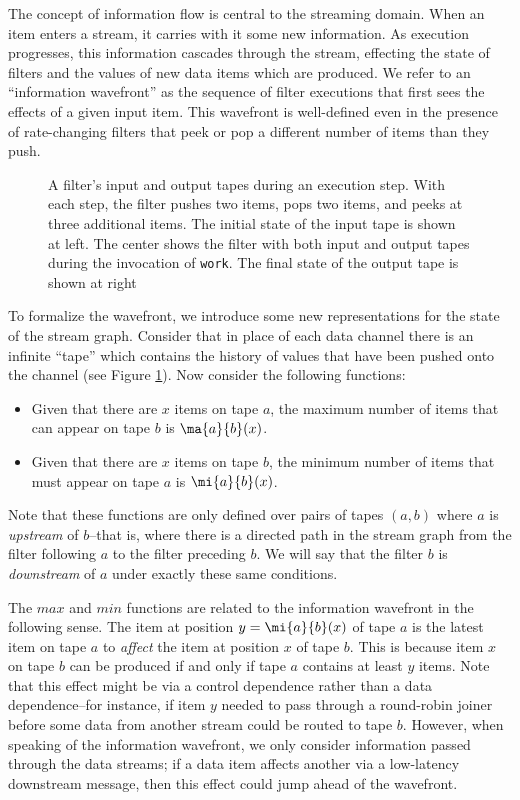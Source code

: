 The concept of information flow is central to the streaming domain.
When an item enters a stream, it carries with it some new information.
As execution progresses, this information cascades through the stream,
effecting the state of filters and the values of new data items which
are produced.  We refer to an ``information wavefront'' as the
sequence of filter executions that first sees the effects of a given
input item.  This wavefront is well-defined even in the presence of
rate-changing filters that peek or pop a different number of items
than they push.
\begin{figure}
\centering
{}
\caption{A filter's input and output tapes during an execution step.  With each step, the filter pushes two items, pops two items, and peeks at three additional items.  The initial state of the input tape is shown at left.  The center shows the filter with both input and output tapes during the invocation of {\tt work}.  The final state of the output tape is shown at right}
\label{fig:tapes}
\end{figure}
To formalize the wavefront, we introduce some new representations for
the state of the stream graph.  Consider that in place of each data
channel there is an infinite ``tape'' which contains the history of
values that have been pushed onto the channel (see Figure
\ref{fig:tapes}).  Now consider the following functions:
\begin{itemize}
\item Given that there are $x$ items on tape $a$, the maximum number
of items that can appear on tape $b$ is $\ma{a}{b}(x)$.

\item Given that there are $x$ items on tape $b$, the minimum number
of items that must appear on tape $a$ is $\mi{a}{b}(x)$.
\end{itemize}
Note that these functions are only defined over pairs of tapes $(a,
b)$ where $a$ is {\it upstream} of $b$--that is, where there is a
directed path in the stream graph from the filter following $a$ to the
filter preceding $b$.  We will say that the filter $b$ is {\it
downstream} of $a$ under exactly these same conditions.

The $max$ and $min$ functions are related to the information wavefront
in the following sense.  The item at position $y = \mi{a}{b}(x)$ of
tape $a$ is the latest item on tape $a$ to {\it affect} the item at
position $x$ of tape $b$.  This is because item $x$ on tape $b$ can be
produced if and only if tape $a$ contains at least $y$ items.  Note
that this effect might be via a control dependence rather than a data
dependence--for instance, if item $y$ needed to pass through a
round-robin joiner before some data from another stream could be
routed to tape $b$.  However, when speaking of the information
wavefront, we only consider information passed through the data
streams; if a data item affects another via a low-latency downstream
message, then this effect could jump ahead of the wavefront.

